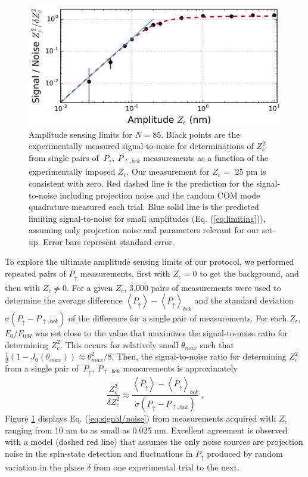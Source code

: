 \documentclass[aps,prl,twocolumn,superscriptaddress,floatfix]{revtex4-1}
\begin{document}
\begin{figure}
\includegraphics[width=\columnwidth]{sensing_limit}
\caption{Amplitude sensing limits for $N=85$. Black points are the experimentally measured signal-to-noise for determinations of $Z_{c}^{2}$ from single pairs of $\ P_{\uparrow},\: P_{\uparrow, bck}$ measurements as a function of the experimentally imposed $Z_c$. Our measurement for $Z_c =$ 25 pm is consistent with zero. Red dashed line is the prediction for the signal-to-noise including projection noise and the random COM mode quadrature measured each trial. Blue solid line is the predicted limiting signal-to-noise for small amplitudes (Eq. (\ref{eq:limiting})), assuming only projection noise and parameters relevant for our set-up. Error bars represent standard error.} \label{Fig_sens}
\end{figure}
To explore the ultimate amplitude sensing limits of our protocol, we performed repeated pairs of $P_{\uparrow}$ measurements, first with $Z_c = 0$ to get the background, and then with \mbox{$Z_{c}\neq0$}. For a given $Z_{c}$, 3,000 pairs of measurements were used to determine the average difference $\left\langle P_{\uparrow}\right\rangle -\left\langle P_{\uparrow}\right\rangle _{bck}$ and the standard deviation $\sigma\left( P_{\uparrow} - P_{\uparrow ,bck} \right)$ of the difference for a single pair of measurements. For each $Z_c$, $F_{0}/F_{0M}$ was set close to the value that maximizes the signal-to-noise ratio for determining $Z_{c}^{2}$. This occurs for relatively small $\theta_{max}$ such that \mbox{$\frac{1}{2}\left(1-J_{0}\left(\theta_{max}\right)\right)\approx\theta_{max}^{2}/8$}. Then, the signal-to-noise ratio for determining $Z_{c}^{2}$ from a single pair of $\ P_{\uparrow},\: P_{\uparrow, bck}$ measurements is approximately 
\begin{equation}
\frac{Z_{c}^{2}}{\delta Z_{c}^{2}}\approx\frac{\left\langle P_{\uparrow}\right\rangle -\left\langle P_{\uparrow}\right\rangle  _{bck}}{\sigma\left( P_{\uparrow} - P_{\uparrow , bck} \right)}\:.\label{eq:signal/noise}
\end{equation}
Figure \ref{Fig_sens} displays Eq. (\ref{eq:signal/noise}) from measurements acquired with $Z_{c}$
ranging from 10 nm to as small as 0.025 nm. Excellent agreement is observed with a model (dashed red line) that assumes the only noise sources are projection noise in the spin-state detection and fluctuations in $P_{\uparrow}$ produced by random variation in the phase $\delta$ from one experimental trial to the next.
\end{document}
